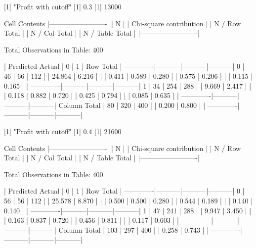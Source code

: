 \documentclass{article}
\begin{document}
\begin{Schunk}
\begin{Soutput}
 
[1] "Profit with cutoff"
[1] 0.3
[1] 13000

 
   Cell Contents
|-------------------------|
|                       N |
| Chi-square contribution |
|           N / Row Total |
|           N / Col Total |
|         N / Table Total |
|-------------------------|

 
Total Observations in Table:  400 

 
             | Predicted 
      Actual |         0 |         1 | Row Total | 
-------------|-----------|-----------|-----------|
           0 |        46 |        66 |       112 | 
             |    24.864 |     6.216 |           | 
             |     0.411 |     0.589 |     0.280 | 
             |     0.575 |     0.206 |           | 
             |     0.115 |     0.165 |           | 
-------------|-----------|-----------|-----------|
           1 |        34 |       254 |       288 | 
             |     9.669 |     2.417 |           | 
             |     0.118 |     0.882 |     0.720 | 
             |     0.425 |     0.794 |           | 
             |     0.085 |     0.635 |           | 
-------------|-----------|-----------|-----------|
Column Total |        80 |       320 |       400 | 
             |     0.200 |     0.800 |           | 
-------------|-----------|-----------|-----------|

 
[1] "Profit with cutoff"
[1] 0.4
[1] 21600

 
   Cell Contents
|-------------------------|
|                       N |
| Chi-square contribution |
|           N / Row Total |
|           N / Col Total |
|         N / Table Total |
|-------------------------|

 
Total Observations in Table:  400 

 
             | Predicted 
      Actual |         0 |         1 | Row Total | 
-------------|-----------|-----------|-----------|
           0 |        56 |        56 |       112 | 
             |    25.578 |     8.870 |           | 
             |     0.500 |     0.500 |     0.280 | 
             |     0.544 |     0.189 |           | 
             |     0.140 |     0.140 |           | 
-------------|-----------|-----------|-----------|
           1 |        47 |       241 |       288 | 
             |     9.947 |     3.450 |           | 
             |     0.163 |     0.837 |     0.720 | 
             |     0.456 |     0.811 |           | 
             |     0.117 |     0.603 |           | 
-------------|-----------|-----------|-----------|
Column Total |       103 |       297 |       400 | 
             |     0.258 |     0.743 |           | 
-------------|-----------|-----------|-----------|


\end{Soutput}
\end{Schunk}
\end{document}
